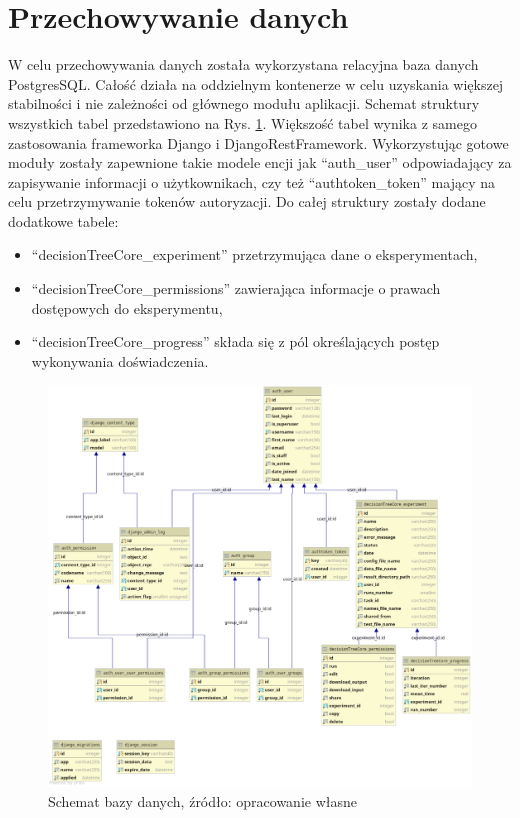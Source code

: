\section{Przechowywanie danych}
W celu przechowywania danych została wykorzystana relacyjna baza danych PostgresSQL. Całość działa  na oddzielnym kontenerze w celu uzyskania większej stabilności i nie zależności od głównego modułu aplikacji. Schemat struktury wszystkich tabel przedstawiono na Rys. \ref{rys5_database_schema}. Większość tabel wynika z samego zastosowania frameworka Django i DjangoRestFramework. Wykorzystując gotowe moduły zostały zapewnione takie modele encji jak \enquote{auth\_user} odpowiadający za zapisywanie informacji o użytkownikach, czy też \enquote{authtoken\_token} mający na celu przetrzymywanie tokenów autoryzacji. Do całej struktury zostały dodane dodatkowe tabele:
\begin{itemize}
	\item \enquote{decisionTreeCore\_experiment} przetrzymująca dane o eksperymentach,  
	\item \enquote{decisionTreeCore\_permissions} zawierająca informacje o prawach dostępowych do eksperymentu,
	\item \enquote{decisionTreeCore\_progress} składa się z pól określających postęp wykonywania doświadczenia.
\end{itemize}



\begin{figure}[htb]
	\centering
	\includegraphics[angle=270, width=16cm]{grafika/database_schema.eps}
	\caption{Schemat bazy danych, źródło: opracowanie własne}
	\label{rys5_database_schema}
\end{figure}

